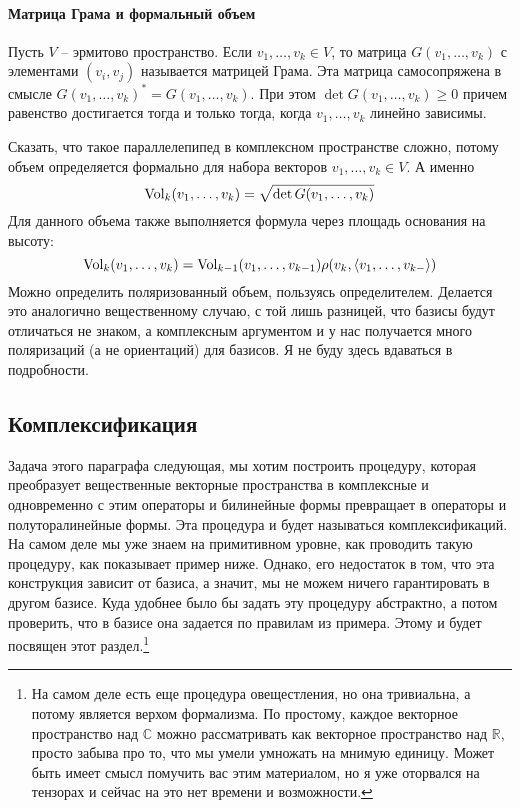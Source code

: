 \paragraph{Матрица Грама и формальный объем}

Пусть $V$ -- эрмитово пространство. Если $v_1,\ldots,v_k\in V$, то матрица $G(v_1,\ldots,v_k)$ с элементами $(v_i, v_j)$ называется матрицей Грама. Эта матрица самосопряжена в смысле $G(v_1,\ldots,v_k)^* = G(v_1,\ldots,v_k)$. При этом $\det G(v_1,\ldots,v_k)\geqslant 0$ причем равенство достигается тогда и только тогда, когда $v_1,\ldots,v_k$ линейно зависимы.

Сказать, что такое параллелепипед в комплексном пространстве сложно, потому объем определяется формально для набора векторов $v_1,\ldots,v_k\in V$. А именно
\[
\operatorname{Vol}_k(v_1,\ldots,v_k) = \sqrt{\det G(v_1,\ldots,v_k)}
\]
Для данного объема также выполняется формула через площадь основания на высоту:
\[
\operatorname{Vol}_k(v_1,\ldots,v_k) = \operatorname{Vol}_{k-1}(v_1,\ldots,v_{k-1}) \rho(v_k, \langle v_1,\ldots,v_{k-}\rangle)
\]
Можно определить поляризованный объем, пользуясь определителем. Делается это аналогично вещественному случаю, с той лишь разницей, что базисы будут отличаться  не знаком, а комплексным аргументом и у нас получается много поляризаций (а не ориентаций) для базисов. Я не буду здесь вдаваться в подробности.

\subsection{Комплексификация}


Задача этого параграфа следующая, мы хотим построить процедуру, которая преобразует вещественные векторные пространства в комплексные и одновременно с этим операторы и билинейные формы превращает в операторы и полуторалинейные формы. Эта процедура и будет называться комплексификаций. На самом деле мы уже знаем на примитивном уровне, как проводить такую процедуру, как показывает пример ниже. Однако, его недостаток в том, что эта конструкция зависит от базиса, а значит, мы не можем ничего гарантировать в другом базисе. Куда удобнее было бы задать эту процедуру абстрактно, а потом проверить, что в базисе она задается по правилам из примера. Этому и будет посвящен этот раздел.\footnote{На самом деле есть еще процедура овещестления, но она тривиальна, а потому является верхом формализма. По простому, каждое векторное пространство над $\mathbb C$ можно рассматривать как векторное пространство над $\mathbb R$, просто забыва про то, что мы умели умножать на мнимую единицу. Может быть имеет смысл помучить вас этим материалом, но я уже оторвался на тензорах и сейчас на это нет времени и возможности.}

